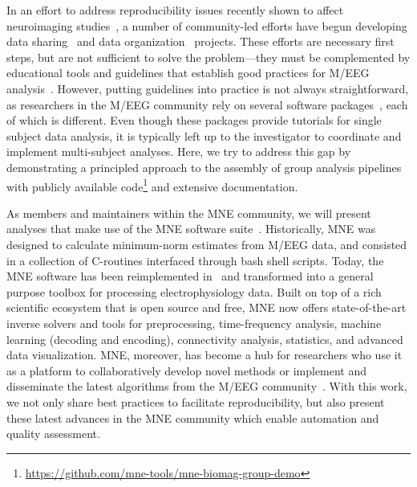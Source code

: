 In an effort to address reproducibility issues recently shown to affect neuroimaging studies~\citep{ioannidis2005most, button2013power,Carp2012,Carp2012289}, a number of community-led efforts have begun developing data sharing~\citep{poldrack2017openfmri} and data organization~\citep{gorgolewski2016brain, niso2018meg} projects. These efforts are necessary first steps, but are not sufficient to solve the problem---they must be complemented by educational tools and guidelines that establish good practices for M/EEG analysis~\citep{gross-etal:13}. However, putting guidelines into practice is not always straightforward, as researchers in the M/EEG community rely on several software packages~\citep{tadel2011brainstorm,delorme2004eeglab,eeglab2,
oostenveld2010fieldtrip,nutmeg,litvak2011eeg}, each of which is different. Even though these packages provide tutorials for single subject data analysis, it is typically left up to the investigator to coordinate and implement multi-subject analyses. Here, we try to address this gap by demonstrating a principled approach to the assembly of group analysis pipelines with publicly available code\footnote{\url{https://github.com/mne-tools/mne-biomag-group-demo}} and extensive documentation. 

As members and maintainers within the MNE community, we will present analyses that make use of the MNE software suite~\citep{mne}. Historically, MNE was designed to calculate minimum-norm estimates from M/EEG data, and consisted in a collection of C-routines interfaced through bash shell scripts. Today, the MNE software has been reimplemented in~\citep{gramfort2013meg} and transformed into a general purpose toolbox for processing electrophysiology data. Built on top of a rich scientific ecosystem that is open source and free, MNE now offers state-of-the-art inverse solvers and tools for preprocessing, time-frequency analysis, machine learning (decoding and encoding), connectivity analysis, statistics, and advanced data visualization. MNE, moreover, has become a hub for researchers who use it as a platform to collaboratively develop novel methods or implement and disseminate the latest algorithms from the M/EEG community~\citep{engemann2015automated, smith2015regression1, smith2015regression2, haufe2014interpretation, king2014characterizing, gramfort-etal:2013, schurger2013reducing, khan2013note, larson_cortical_2012, hauk2011comparison, gramfort2010graph, rivet2009xdawn, kriegeskorte2008representational, maris_nonparametric_2007}. With this work, we not only  share best practices to facilitate reproducibility, but also present these latest advances in the MNE community which enable automation and quality assessment.

